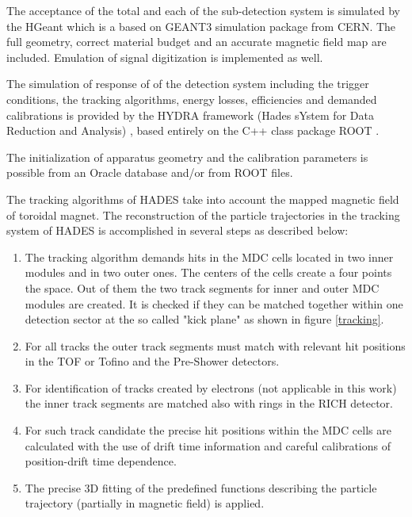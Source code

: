 The acceptance of the total and each of the sub-detection system is simulated by the HGeant \cite{HGeant} which is a based on  GEANT3 \cite{brun1993geant} simulation package from CERN. The
full geometry, correct material budget and an accurate magnetic field map are included. Emulation of signal digitization is implemented as well.

The simulation of response of of the detection system including the trigger conditions, the tracking algorithms, energy losses, efficiencies and demanded calibrations is provided by the HYDRA framework (Hades sYstem for Data Reduction and Analysis) \cite{HYDRA}, based entirely on the C++ class package ROOT \cite{BRUN199781}. 

The initialization of apparatus geometry and the calibration parameters is possible from an Oracle database and/or from ROOT files. 

The tracking algorithms of HADES take into account the mapped magnetic field of toroidal magnet. The reconstruction of the particle trajectories in the tracking system of HADES is accomplished in several steps as described below:
\begin{enumerate}
\item The tracking algorithm demands hits in the MDC cells located in two inner modules and in two outer ones. 
The centers of the cells create a four points the space. 
Out of them the two track segments for inner and outer MDC modules are created. 
It is checked if they can be matched together within one detection sector at the so called "kick plane" as shown in figure \ref{tracking}.   
\item For all tracks the outer track segments must match with relevant hit positions in the TOF or Tofino and the Pre-Shower detectors.
\item For identification of tracks created by electrons (not applicable in this work) the inner track segments are matched also  with rings in the RICH detector. 
\item  For such track candidate the precise hit positions within the MDC cells are calculated with the use of drift time information and 
careful calibrations of position-drift time dependence.
\item The precise 3D fitting of the predefined functions describing the particle trajectory (partially in magnetic field) is applied.  
\end{enumerate}

